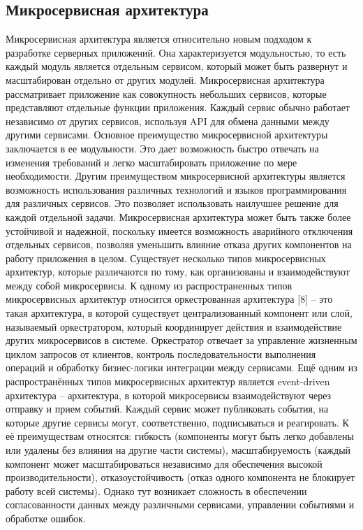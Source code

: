\subsection{Микросервисная архитектура}

Микросервисная архитектура является относительно новым подходом к разработке серверных приложений. Она характеризуется модульностью, то есть каждый модуль является отдельным сервисом, который может быть развернут и масштабирован отдельно от других модулей. Микросервисная архитектура рассматривает приложение как совокупность небольших сервисов, которые представляют отдельные функции приложения. Каждый сервис обычно работает независимо от других сервисов, используя API для обмена данными между другими сервисами.
Основное преимущество микросервисной архитектуры заключается в ее модульности\cite{newman2019monolith}. Это дает возможность быстро отвечать на изменения требований и легко масштабировать приложение по мере необходимости. Другим преимуществом микросервисной архитектуры является возможность использования различных технологий и языков программирования для различных сервисов. Это позволяет использовать наилучшее решение для каждой отдельной задачи. Микросервисная архитектура может быть также более устойчивой и надежной, поскольку имеется возможность аварийного отключения отдельных сервисов, позволяя уменьшить влияние отказа других компонентов на работу приложения в целом.
Существует несколько типов микросервисных архитектур, которые различаются по тому, как организованы и взаимодействуют между собой микросервисы. К одному из распространенных типов микросервисных архитектур относится оркестрованная архитектура [8] – это такая архитектура, в которой существует централизованный компонент или слой, называемый оркестратором, который координирует действия и взаимодействие других микросервисов в системе. Оркестратор отвечает за управление жизненным циклом запросов от клиентов, контроль последовательности выполнения операций и обработку бизнес-логики интеграции между сервисами. 
Ещё одним из распространённых типов микросервисных архитектур является event-driven архитектура – архитектура, в которой микросервисы взаимодействуют через отправку и прием событий. Каждый сервис может публиковать события, на которые другие сервисы могут, соответственно, подписываться и реагировать. К её преимуществам относятся: гибкость (компоненты могут быть легко добавлены или удалены без влияния на другие части системы), масштабируемость (каждый компонент может масштабироваться независимо для обеспечения высокой производительности), отказоустойчивость (отказ одного компонента не блокирует работу всей системы). Однако тут возникает сложность в обеспечении согласованности данных между различными сервисами, управлении событиями и обработке ошибок.
